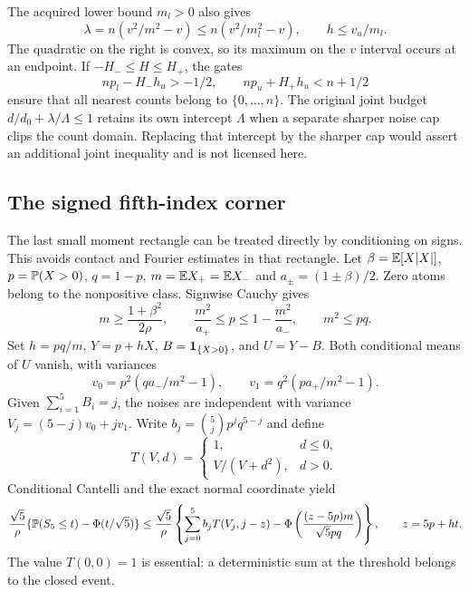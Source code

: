 The acquired lower bound $m_l>0$ also gives
\[
 \lambda=n(v^2/m^2-v)\le n(v^2/m_l^2-v),\qquad h\le v_u/m_l.
\]
The quadratic on the right is convex, so its maximum on the $v$
interval occurs at an endpoint. If $-H_-\le H\le H_+$, the gates
\[
 np_l-H_-h_u>-1/2,\qquad np_u+H_+h_u<n+1/2
\]
ensure that all nearest counts belong to $\{0,\ldots,n\}$.
The original joint budget $d/d_0+\lambda/\Lambda\le1$ retains
its own intercept $\Lambda$ when a separate sharper noise cap clips
the count domain. Replacing that intercept by the sharper cap would
assert an additional joint inequality and is not licensed here.

\subsection{The signed fifth-index corner}
\label{j:finite:gapfree5}
The last small moment rectangle can be treated directly by conditioning
on signs. This avoids contact and Fourier estimates in that rectangle.
Let $\beta=\mathbb E[X|X|]$, $p=\mathbb P(X>0)$, $q=1-p$,
$m=\mathbb E X_+=\mathbb E X_-$ and $a_\pm=(1\pm\beta)/2$.
Zero atoms belong to the nonpositive class. Signwise Cauchy gives
\[
 m\ge\frac{1+\beta^2}{2\rho},\qquad
 \frac{m^2}{a_+}\le p\le1-\frac{m^2}{a_-},\qquad m^2\le pq.
\]
Set $h=pq/m$, $Y=p+hX$, $B=\mathbf1_{\{X>0\}}$, and $U=Y-B$.
Both conditional means of $U$ vanish, with variances
\[
 v_0=p^2(qa_-/m^2-1),\qquad v_1=q^2(pa_+/m^2-1).
\]
Given $\sum_{i=1}^5B_i=j$, the noises are independent with variance
$V_j=(5-j)v_0+jv_1$. Write $b_j=\binom5j p^jq^{5-j}$ and define
\[
 T(V,d)=\begin{cases}1,&d\le0,\\V/(V+d^2),&d>0.\end{cases}
\]
Conditional Cantelli and the exact normal coordinate yield
\begin{equation}\label{j:finite:gapfree-bound}
 \frac{\sqrt5}{\rho}\{\mathbb P(S_5\le t)-\Phi(t/\sqrt5)\}
 \le\frac{\sqrt5}{\rho}
 \left\{\sum_{j=0}^5 b_jT(V_j,j-z)
          -\Phi\left(\frac{(z-5p)m}{\sqrt5pq}\right)\right\},
 \qquad z=5p+ht.
\end{equation}
The value $T(0,0)=1$ is essential: a deterministic sum at the threshold
belongs to the closed event.

